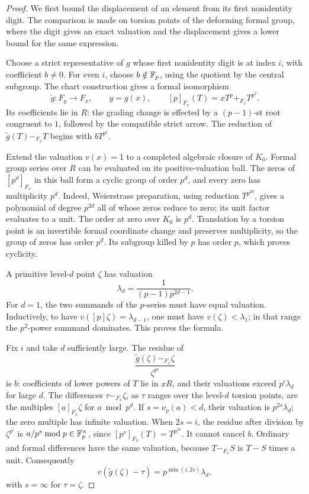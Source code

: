 \begin{proof}
We first bound the displacement of an element from its first
nonidentity digit. The comparison is made on torsion points of the
deforming formal group, where the digit gives an exact valuation
and the displacement gives a lower bound for the same expression.

Choose a strict representative of $g$ whose first nonidentity digit is
at index $i$, with coefficient $b\ne0$. For even $i$, choose
$b\notin\mathbb F_p$, using the quotient by the central subgroup. The chart
construction gives a formal isomorphism
\[
 \widetilde g:F_y\longrightarrow F_x,\qquad y=g(x),
 \qquad [p]_{F_x}(T)=xT^p+_{F_x}T^{p^2}.
\]
Its coefficients lie in $R$: the grading change is effected by a
$(p-1)$-st root congruent to $1$, followed by the compatible strict
arrow. The reduction of $\widetilde g(T)-_{F_x}T$ begins with
$bT^{p^i}$.

Extend the valuation $v(x)=1$ to a completed algebraic closure of $K_0$.
Formal group series over $R$ can be evaluated on its positive-valuation
ball. The zeros of $[p^d]_{F_x}$ in this ball form a cyclic group of order
$p^d$, and every zero has multiplicity $p^d$. Indeed, Weierstrass
preparation, using reduction $T^{p^{2d}}$, gives a polynomial of degree
$p^{2d}$ all of whose zeros reduce to zero; its unit factor evaluates to
a unit. The order at zero over $K_0$ is $p^d$. Translation by a torsion
point is an invertible formal coordinate change and preserves
multiplicity, so the group of zeros has order $p^d$. Its subgroup killed
by $p$ has order $p$, which proves cyclicity.

A primitive level-$d$ point $\zeta$ has valuation
\[
 \lambda_d=\frac1{(p-1)p^{2d-1}}.
\]
For $d=1$, the two summands of the $p$-series must have equal valuation.
Inductively, to have $v([p]\zeta)=\lambda_{d-1}$, one must have
$v(\zeta)<\lambda_1$; in that range the $p^2$-power summand dominates.
This proves the formula.

Fix $i$ and take $d$ sufficiently large. The residue of
\[
 \frac{\widetilde g(\zeta)-_{F_x}\zeta}{\zeta^{p^i}}
\]
is $b$: coefficients of lower powers of $T$ lie in $xR$, and their
valuations exceed $p^i\lambda_d$ for large $d$. The differences
$\tau-_{F_x}\zeta$, as $\tau$ ranges over the level-$d$ torsion points,
are the multiples $[a]_{F_x}\zeta$ for $a\bmod p^d$. If
$s=\nu_p(a)<d$, their valuation is $p^{2s}\lambda_d$; the zero multiple
has infinite valuation. When $2s=i$, the residue after division by
$\zeta^{p^i}$ is $a/p^s\bmod p\in\mathbb F_p^\times$, since
$[p^s]_{F_0}(T)=T^{p^{2s}}$. It cannot cancel $b$. Ordinary and formal
differences have the same valuation, because $T-_{F_x}S$ is $T-S$ times
a unit. Consequently
\[
 v(\widetilde g(\zeta)-\tau)=p^{\min(i,2s)}\lambda_d,
\]
with $s=\infty$ for $\tau=\zeta$.


\end{proof}
